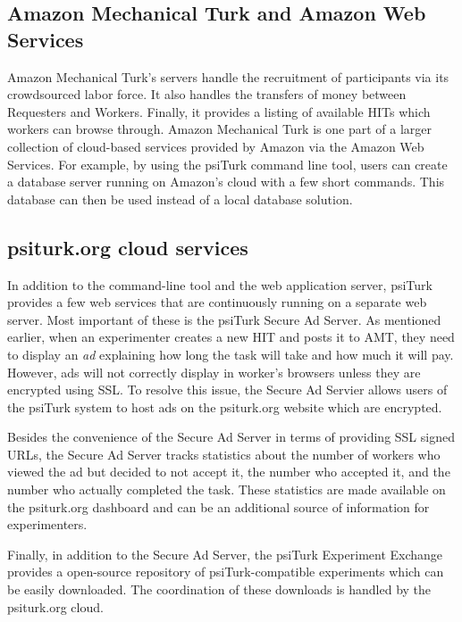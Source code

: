 \documentclass[twocolumn]{svjour3}          %
\newcommand{\psiturk}[0]{\textsf{psiTurk}}
\begin{document}
\subsection{Amazon Mechanical Turk and Amazon Web Services}

Amazon Mechanical Turk's servers handle the recruitment of participants via
its crowdsourced labor force.  It also handles the transfers of money between Requesters and
Workers.  Finally, it provides a listing of available HITs which workers can browse 
through.  Amazon Mechanical Turk is one part of a larger collection
of cloud-based services provided by Amazon via the Amazon Web Services.
For example, by using the \psiturk{} command line tool, users can create a
database server running on Amazon's cloud with a few short commands.  This database
can then be used instead of a local database solution.

\subsection{\textsf{psiturk.org} cloud services}
In addition to the command-line tool and the web application server, \psiturk{}
provides a few web services that are continuously running on a separate web server.
Most important of these is the \psiturk{} Secure Ad Server.  As mentioned earlier, when an experimenter
creates a new HIT and posts it to AMT, they need to display an \emph{ad} explaining how long the task will take and how
much it will pay.  However, ads will not correctly display
in worker's browsers unless they are encrypted using SSL.  To resolve this issue, the
Secure Ad Servier allows users of the \psiturk{} system to host ads on the \textsf{psiturk.org}
website which are encrypted.

Besides the convenience of the Secure Ad Server in terms of providing
SSL signed URLs, the Secure Ad Server tracks statistics about the
number of workers who viewed the ad but decided to not accept it, the
number who accepted it, and the number who actually completed the task.
These statistics are made available on the \textsf{psiturk.org} dashboard
and can be an additional source of information for experimenters.

Finally, in addition to the Secure Ad Server, the \psiturk{} Experiment Exchange provides
a open-source repository of \psiturk{}-compatible experiments which can be 
easily downloaded.  The coordination of these downloads is handled by the \textsf{psiturk.org} cloud. 

\end{document}
